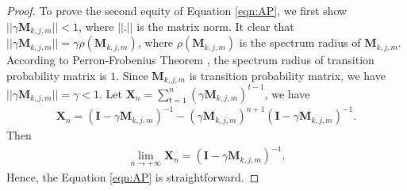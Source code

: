 \begin{proof}
    To prove the second equity of Equation \eqref{eqn:AP}, we first show $||\gamma\mathbf{M}_{k,j,m}||<1$, where $||.||$ is the matrix norm. It clear that $||\gamma\mathbf{M}_{k,j,m}||=\gamma\rho(\mathbf{M}_{k,j,m})$, where $\rho(\mathbf{M}_{k,j,m})$ is the spectrum radius of  $\mathbf{M}_{k,j,m}$. According to Perron-Frobenius Theorem \cite{meyer2000matrix}, the spectrum radius of transition probability matrix is $1$. Since $\mathbf{M}_{k,j,m}$ is transition probability matrix, we have $||\gamma\mathbf{M}_{k,j,m}||=\gamma<1$. Let $\mathbf{X}_n=\sum_{t=1}^{n}(\gamma\mathbf{M}_{k,j,m})^{t-1}$, we have
    \begin{align*}
        \mathbf{X}_n=(\mathbf{I}-\gamma\mathbf{M}_{k,j,m})^{-1}-(\gamma\mathbf{M}_{k,j,m})^{n+1}(\mathbf{I}-\gamma\mathbf{M}_{k,j,m})^{-1}.
    \end{align*}
    Then
    \begin{align*}
        \lim\limits_{n\to+\infty} \mathbf{X}_n=(\mathbf{I}-\gamma\mathbf{M}_{k,j,m})^{-1}.
    \end{align*}
    Hence, the Equation \eqref{eqn:AP} is straightforward.
\end{proof}


